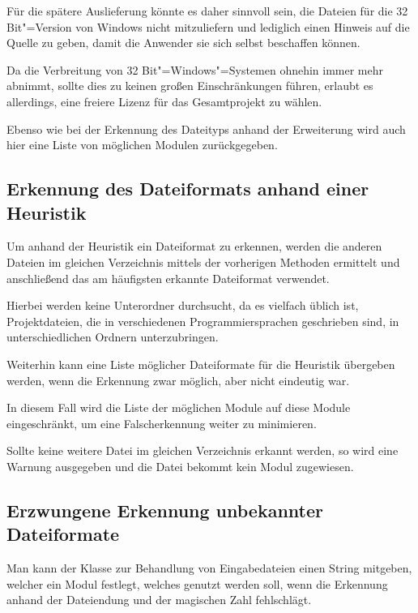             Für die spätere Auslieferung könnte es daher sinnvoll sein,
            die Dateien für die 32 Bit"=Version von Windows nicht mitzuliefern und
            lediglich einen Hinweis auf die Quelle zu geben,
            damit die Anwender sie sich selbst beschaffen können.

            Da die Verbreitung von 32 Bit"=Windows"=Systemen ohnehin immer mehr abnimmt,
            sollte dies zu keinen großen Einschränkungen führen,
            erlaubt es allerdings,
            eine freiere Lizenz für das Gesamtprojekt zu wählen.

            Ebenso
            wie bei der Erkennung des Dateityps anhand der Erweiterung wird auch hier eine Liste von möglichen Modulen zurückgegeben.

        \subsection{Erkennung des Dateiformats anhand einer Heuristik}
            Um anhand der Heuristik ein Dateiformat zu erkennen,
            werden die anderen Dateien im gleichen Verzeichnis mittels der vorherigen Methoden ermittelt und
            anschließend das am häufigsten erkannte Dateiformat verwendet.

            Hierbei werden keine Unterordner durchsucht,
            da es vielfach üblich ist,
            Projektdateien,
            die in verschiedenen Programmiersprachen geschrieben sind,
            in unterschiedlichen Ordnern unterzubringen.

            Weiterhin kann eine Liste möglicher Dateiformate für die Heuristik übergeben werden,
            wenn die Erkennung zwar möglich,
            aber nicht eindeutig war.

            In diesem Fall wird die Liste der möglichen Module auf diese Module eingeschränkt,
            um eine Falscherkennung weiter zu minimieren.

            Sollte keine weitere Datei im gleichen Verzeichnis erkannt werden,
            so wird eine Warnung ausgegeben und
            die Datei bekommt kein Modul zugewiesen.

        \subsection{Erzwungene Erkennung unbekannter Dateiformate}
            Man kann der Klasse zur Behandlung von Eingabedateien einen String mitgeben,
            welcher ein Modul festlegt,
            welches genutzt werden soll,
            wenn die Erkennung anhand der Dateiendung und
            der magischen Zahl fehlschlägt.


